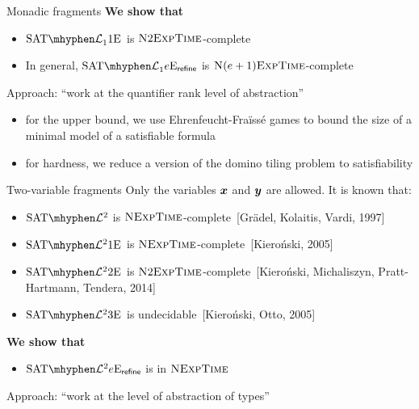 \documentclass{beamer}
\begin{document}
\begin{frame}{Monadic fragments}
\pause
\textbf{We show that}
\begin{itemize}
  \item{$\Sat{\Lvp\LL\nonv1\Eea1\noag}$ is $\text{\normalfont{\scshape N}}2\text{\normalfont{\scshape ExpTime}}$-complete}
  \item{In general, $\Sat{\Lvp\LL\nonv1\Eea\sze\agrefine}$ is
  $\text{\normalfont{\scshape N}}(e+1)\text{\normalfont{\scshape ExpTime}}$-complete}
\end{itemize}
\pause
Approach: ``work at the quantifier rank level of abstraction''
\begin{itemize}
  \item for the upper bound, we use Ehrenfeucht-Fra\"{i}ss\'{e} games to bound
  the size of a minimal model of a satisfiable formula

  \item for hardness, we reduce a version of the domino tiling problem to
satisfiability
\end{itemize}
\end{frame}

\begin{frame}{Two-variable fragments}
Only the variables $\bm{x}$ and $\bm{y}$ are allowed.
It is known that:
\begin{itemize}
  \item{$\Sat{\Lvp\LL2\nopow}$ is $\text{\normalfont{\scshape NExpTime}}$-complete~{[Gr{\"a}del,
  Kolaitis, Vardi, 1997]}}
  \item{$\Sat{\Lvp\LL2\nopow\Eea1\noag}$ is
  $\text{\normalfont{\scshape NExpTime}}$-complete~{[Kiero{\'n}ski, 2005]}}
  \item{$\Sat{\Lvp\LL2\nopow\Eea2\noag}$ is
  $\text{\normalfont{\scshape N}}2\text{\normalfont{\scshape ExpTime}}$-complete~{[Kieroński, Michaliszyn, Pratt-Hartmann, Tendera,
  2014]}}
  \item{$\Sat{\Lvp\LL2\nopow\Eea3\noag}$ is undecidable~{[Kieroński, Otto,
  2005]}}
\end{itemize}
\pause
\textbf{We show that}
\begin{itemize}
  \item{$\Sat{\Lvp\LL2\nopow\Eea\sze\agrefine}$ is in $\text{\normalfont{\scshape NExpTime}}$}
\end{itemize}
Approach: ``work at the level of abstraction of types''
\end{frame}
\end{document}
